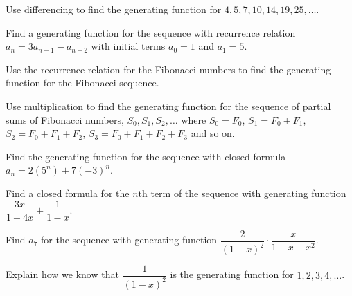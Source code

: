 \documentclass[10pt,]{book}
\theoremstyle{plain}
\theoremstyle{definition}
\theoremstyle{definition}
\theoremstyle{definition}
\theoremstyle{definition}
\numberwithin{equation}{chapter}
\begin{document}
\begin{divisionexercise}{4}\hypertarget{exercise-87}{}
\hypertarget{p-1132}{}%
Use differencing to find the generating function for \(4, 5, 7, 10, 14, 19, 25, \ldots\).%
\end{divisionexercise}%
\begin{divisionexercise}{5}\hypertarget{exercise-88}{}
\hypertarget{p-1134}{}%
Find a generating function for the sequence with recurrence relation \(a_n = 3a_{n-1} - a_{n-2}\) with initial terms \(a_0 = 1\) and \(a_1 = 5\).%
\end{divisionexercise}%
\begin{divisionexercise}{6}\hypertarget{exercise-89}{}
\hypertarget{p-1136}{}%
Use the recurrence relation for the Fibonacci numbers to find the generating function for the Fibonacci sequence.%
\end{divisionexercise}%
\begin{divisionexercise}{7}\hypertarget{exercise-90}{}
\hypertarget{p-1138}{}%
Use multiplication to find the generating function for the sequence of partial sums of Fibonacci numbers, \(S_0, S_1, S_2, \ldots\) where \(S_0 = F_0\), \(S_1 = F_0 + F_1\), \(S_2 = F_0 + F_1 + F_2\), \(S_3 = F_0 + F_1 + F_2 + F_3\) and so on.%
\end{divisionexercise}%
\begin{divisionexercise}{8}\hypertarget{exercise-91}{}
\hypertarget{p-1140}{}%
Find the generating function for the sequence with closed formula \(a_n = 2(5^n) + 7(-3)^n\).%
\end{divisionexercise}%
\begin{divisionexercise}{9}\hypertarget{exercise-92}{}
\hypertarget{p-1142}{}%
Find a closed formula for the \(n\)th term of the sequence with generating function \(\dfrac{3x}{1-4x} + \dfrac{1}{1-x}\).%
\end{divisionexercise}%
\begin{divisionexercise}{10}\hypertarget{exercise-93}{}
\hypertarget{p-1144}{}%
Find \(a_7\) for the sequence with generating function \(\dfrac{2}{(1-x)^2}\cdot\dfrac{x}{1-x-x^2}\).%
\end{divisionexercise}%
\begin{divisionexercise}{11}\hypertarget{exercise-94}{}
\hypertarget{p-1146}{}%
Explain how we know that \(\dfrac{1}{(1-x)^2}\) is the generating function for \(1, 2, 3, 4, \ldots\).%
\end{divisionexercise}%
\end{document}
